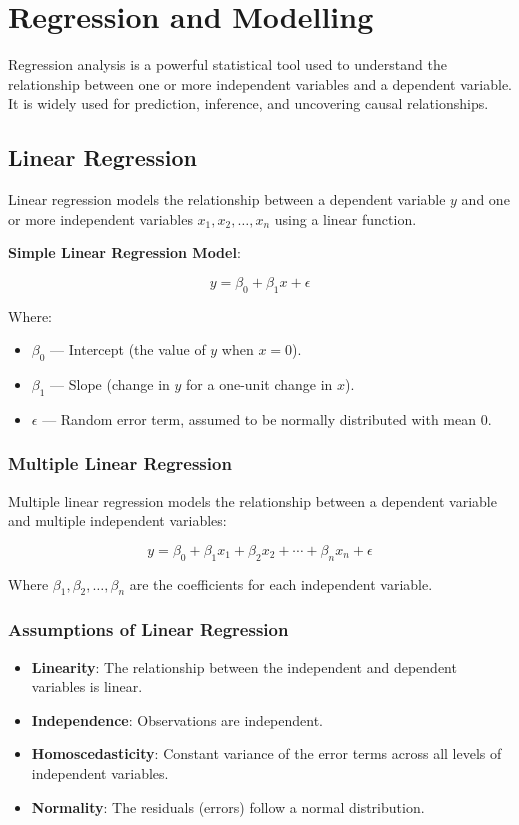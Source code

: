 \section{Regression and Modelling}

Regression analysis is a powerful statistical tool used to understand the relationship between one or more independent variables and a dependent variable. It is widely used for prediction, inference, and uncovering causal relationships.

\subsection{Linear Regression}
Linear regression models the relationship between a dependent variable \(y\) and one or more independent variables \(x_1, x_2, \ldots, x_n\) using a linear function.

\textbf{Simple Linear Regression Model}:

\[
y = \beta_0 + \beta_1 x + \epsilon
\]

Where:
\begin{itemize}
    \item \(\beta_0\) --- Intercept (the value of \(y\) when \(x = 0\)).
    \item \(\beta_1\) --- Slope (change in \(y\) for a one-unit change in \(x\)).
    \item \(\epsilon\) --- Random error term, assumed to be normally distributed with mean 0.
\end{itemize}

\subsubsection{Multiple Linear Regression}
Multiple linear regression models the relationship between a dependent variable and multiple independent variables:

\[
y = \beta_0 + \beta_1 x_1 + \beta_2 x_2 + \cdots + \beta_n x_n + \epsilon
\]

Where \(\beta_1, \beta_2, \ldots, \beta_n\) are the coefficients for each independent variable.

\subsubsection{Assumptions of Linear Regression}
\begin{itemize}
    \item \textbf{Linearity}: The relationship between the independent and dependent variables is linear.
    \item \textbf{Independence}: Observations are independent.
    \item \textbf{Homoscedasticity}: Constant variance of the error terms across all levels of independent variables.
    \item \textbf{Normality}: The residuals (errors) follow a normal distribution.
\end{itemize}

